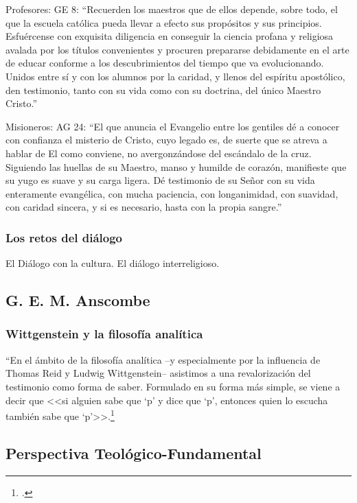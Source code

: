 \documentclass[12pt]{article}
\begin{document}
{Profesores:
GE 8:
``Recuerden los maestros que de ellos depende, sobre todo, el que la escuela católica pueda llevar a efecto sus propósitos y sus principios. Esfuércense con exquisita diligencia en conseguir la ciencia profana y religiosa avalada por los títulos convenientes y procuren prepararse debidamente en el arte de educar conforme a los descubrimientos del tiempo que va evolucionando. Unidos entre sí y con los alumnos por la caridad, y llenos del espíritu apostólico, den testimonio, tanto con su vida como con su doctrina, del único Maestro Cristo.''

Misioneros:
AG 24:
``El que anuncia el Evangelio entre los gentiles dé a conocer con confianza el misterio de Cristo, cuyo legado es, de suerte que se atreva a hablar de El como conviene, no avergonzándose del escándalo de la cruz. Siguiendo las huellas de su Maestro, manso y humilde de corazón, manifieste que su yugo es suave y su carga ligera. Dé testimonio de su Señor con su vida enteramente evangélica, con mucha paciencia, con longanimidad, con suavidad, con caridad sincera, y si es necesario, hasta con la propia sangre.''



\subsubsection{Los retos del diálogo}
El Diálogo con la cultura. El diálogo interreligioso. 


\subsection{G. E. M. Anscombe}

\subsubsection{Wittgenstein y la filosofía analítica}
``En el ámbito de la filosofía analítica --y especialmente por la influencia de Thomas Reid y Ludwig Wittgenstein-- asistimos a una revalorización del testimonio como forma de saber. Formulado en su forma más simple, se viene a decir que <<si alguien sabe que `p' y dice que `p', entonces quien lo escucha también sabe que `p'>>.\footcite[p.~487]{feylogicaconesa}

\subsection{Perspectiva Teológico-Fundamental}





}
\end{document}
